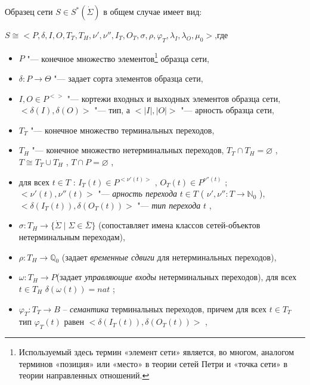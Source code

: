 Образец сети  $S\in{S^*(\dot{\Sigma})}$   в общем случае имеет вид:
\begin{center}
	$S\cong<P, \delta, I, O, T_T, T_H, \nu', \nu'', I_T, O_T, \sigma, \rho, \varphi_T, \lambda_I, \lambda_O, \mu_0> $,где
\end{center}
\begin{itemize}
	\item $P$ 
	"--- конечное множество элементов\footnote{Используемый здесь термин «элемент сети» является, во многом, аналогом терминов «позиция» или «место» в теории сетей Петри и «точка сети» в теории направленных отношений.}
	образца сети,
	
	\item $\delta:P \rightarrow \Theta$  "--- задает сорта элементов образца сети,
	\item  $I, O \in P^{<>}$ "--- кортежи входных и выходных элементов образца сети, \mbox{$<\delta(I), \delta(O)>$}  "---  тип, а $<|I|, |O|>$   "--- арность образца сети,
	
	\item $T_T$ 
	"--- конечное множество терминальных переходов,
	
	\item $T_H$ 
	"--- конечное множество нетерминальных переходов,
	$T_T \cap T_H = \varnothing$  , $T\cong  T_T \cup T_H$ , $T \cap P = \varnothing$ ,
	
	\item	для всех $ t \in T$  : $I_T(t) \in P^{<\nu'(t)>}$ ,
	$ O_T(t) \in P^{\nu''(t)} $  ;\\
	$<\nu'(t), \nu''(t)>$   "--- \textit{арность перехода}  $ t \in T $   ( $ \nu', \nu'':T\rightarrow\mathbb{N}_0 $ ),\\
	$ <\delta(I_T(t)), \delta(O_T(t))> $  "--- \textit{тип перехода} $t$  , 
	
	\item $ \sigma:T_H \rightarrow \{ \dot{\Sigma}\;| \;\Sigma \in \bar{\Sigma} \} $ (сопоставляет имена классов сетей-объектов нетерминальным переходам),
	
	\item $ \rho:T_H \rightarrow \mathbb{Q}_0 $ (задает \textit{временные сдвиги} для нетерминальных переходов),
	
	\item $ \omega:T_H \rightarrow P $(задает \textit{управляющие входы} нетерминальных переходов), для всех  $ t \in T_H $  $ \delta(\omega(t)) = \textit{nat} $   ;
	
	\item $ \varphi_T:T_T \rightarrow B $ – \textit{семантика} терминальных переходов, причем для всех  $ t \in T_T $    тип  $\varphi_T(t)$    равен  $ <\delta(I_T(t)), \delta(O_T(t))> $  ,
	

\end{itemize}

